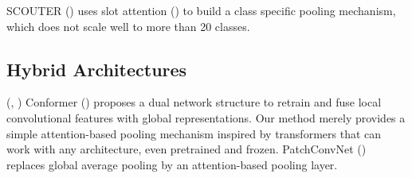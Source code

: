 SCOUTER (\cite{li2021scouter}) uses slot attention (\cite{locatello2020object}) to build a class 
specific pooling mechanism, which does not scale well to more than 20 classes. 

\subsection{Hybrid Architectures}
\label{rel:sub_hybrid}
(\cite{graham2021levit}, \cite{xiao2021early})
Conformer (\cite{peng2021conformer}) proposes a dual network structure to retrain and fuse local 
convolutional features with global representations. Our method merely provides a simple 
attention-based pooling mechanism inspired by transformers that can work with any architecture, 
even pretrained and frozen. PatchConvNet (\cite{touvron2021augmenting}) replaces global average pooling by an 
attention-based pooling layer.
